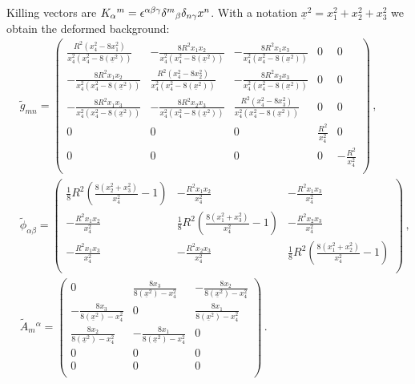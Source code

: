 \documentclass[12pt, utf8]{article}
\numberwithin{equation}{section}
\begin{document}
Killing vectors are $K_{\alpha}{}^{m} = \epsilon^{\alpha \beta \gamma} \delta^{m}{}_{\beta} \delta_{n \gamma} x^{n}$. With a notation $\underline{x}^2 = x_1^2 + x_2^2 + x_3^2$ we obtain the deformed background:
\begin{equation}
    \begin{aligned}
    &    \tilde{g}_{m n} = \left(
\begin{array}{ccccc}
 \frac{R^2 \left(x_4^2-8 x_1^2\right)}{x_4^2(x_4^2-8 \left(\underline{x}^2\right))} & -\frac{8 R^2 x_1 x_2}{x_4^2(x_4^2-8 \left(\underline{x}^2\right))} & -\frac{8 R^2 x_1 x_3}{x_4^2(x_4^2-8 \left(\underline{x}^2\right))} & 0 & 0 \\
 -\frac{8 R^2 x_1 x_2}{x_4^2(x_4^2-8 \left(\underline{x}^2\right))} & \frac{R^2 \left(x_4^2-8 x_2^2\right)}{x_4^2(x_4^2-8 \left(\underline{x}^2\right))} & -\frac{8 R^2 x_2 x_3}{x_4^2(x_4^2-8 \left(\underline{x}^2\right))} & 0 & 0 \\
 -\frac{8 R^2 x_1 x_3}{x_4^2(x_4^2-8 \left(\underline{x}^2\right))} & -\frac{8 R^2 x_2 x_3}{x_4^2(x_4^2-8 \left(\underline{x}^2\right))} & \frac{R^2 \left(x_4^2-8 x_3^2\right)}{x_4^2(x_4^2-8 \left(\underline{x}^2\right))} & 0 & 0 \\
 0 & 0 & 0 & \frac{R^2}{x_4^2} & 0 \\
 0 & 0 & 0 & 0 & -\frac{R^2}{x_4^2} \\
\end{array}
\right) \, , \\
& \tilde{\phi}_{\alpha \beta} = \left(
\begin{array}{ccc}
 \frac{1}{8} R^2 \left(\frac{8 \left(x_2^2+x_3^2\right)}{x_4^2}-1\right) & -\frac{R^2 x_1 x_2}{x_4^2} & -\frac{R^2 x_1 x_3}{x_4^2} \\
 -\frac{R^2 x_1 x_2}{x_4^2} & \frac{1}{8} R^2 \left(\frac{8 \left(x_1^2+x_3^2\right)}{x_4^2}-1\right) & -\frac{R^2 x_2 x_3}{x_4^2} \\
 -\frac{R^2 x_1 x_3}{x_4^2} & -\frac{R^2 x_2 x_3}{x_4^2} & \frac{1}{8} R^2 \left(\frac{8 \left(x_1^2+x_2^2\right)}{x_4^2}-1\right) \\
\end{array}
\right) \, , \\
& \tilde{A}_{m}{}^{\alpha} = \left(
\begin{array}{ccc}
 0 & \frac{8 x_3}{8 \left(\underline{x}^2\right)-x_4^2} & -\frac{8 x_2}{8 \left(\underline{x}^2\right)-x_4^2} \\
 -\frac{8 x_3}{8 \left(\underline{x}^2\right)-x_4^2} & 0 & \frac{8 x_1}{8 \left(\underline{x}^2\right)-x_4^2} \\
 \frac{8 x_2}{8 \left(\underline{x}^2\right)-x_4^2} & -\frac{8 x_1}{8 \left(\underline{x}^2\right)-x_4^2} & 0 \\
 0 & 0 & 0 \\
 0 & 0 & 0 \\
\end{array}
\right) \, .
    \end{aligned}
\end{equation}
\end{document}
